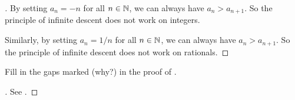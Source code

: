 \begin{proof}[]
  By setting \(a_n = -n\) for all \(n \in \mathbb{N}\), we can always have \(a_n > a_{n + 1}\).
  So the principle of infinite descent does not work on integers.

  Similarly, by setting \(a_n = 1 / n\) for all \(n \in \mathbb{N}\), we can always have \(a_n > a_{n + 1}\).
  So the principle of infinite descent does not work on rationals.
\end{proof}

\begin{ex}\label{i:ex:4.4.3}
  Fill in the gaps marked (why?) in the proof of .
\end{ex}

\begin{proof}[]
  See .
\end{proof}
